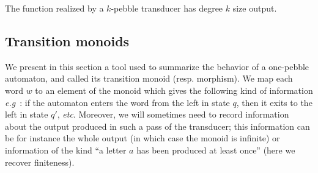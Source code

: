 \begin{comment}

\begin{definition}
  We define, by induction on $k$ the function, realized by a $k$-pebble automaton. The case $k=1$ has been treated in Definition~\ref{def:1pebble}. 
  
  Consider a $k+1$ pebble transducer $\Tt$. We set $Q_i$ to be the set of states of $\Tt_i$.
  Let us define the image of a word $w$ of $\Sigma^*$ by the transduction realized by $\Tt$.
  
  \noindent Let $r=(q_j,\mathsf{pos}_j)_{j\in[1, n]}$ be the accepting run of $\Tt_{k+1}$ over $w$ and $(o_j)_{j\in[1, n]}$ be the outputs of the corresponding configurations.
  
  \noindent For every $q\in Q_i$, let $f^i_q:\Sigma_{[k,i+1]}^*\rightarrow \Gamma^*$ be the transduction realized by $\Tt[1,i]$, considering $q$ as its initial state.
   
   For every $j\in[1,n]$, let $w_j$ be the word obtained from $w$ by replacing the letter $a$ at position $\mathsf{pos}_j$ by $(a,k+1)$.
      For every $j\in[1,n]$, let $u_j$ be the word obtained from $o_j$ by replacing every state $q\in Q_i$ by $f^i_q(w_j)$.
      
  The image of $w$ by $\Tt$ is the word $(u_j)_{j\in[1,n]}$.
  \end{definition}

    
\end{comment}




\begin{proposition}[\cite{}]
  \label{prop:degree}
The function realized by a $k$-pebble transducer has degree $k$ size output.
\end{proposition}

\subsection{Transition monoids}
We present in this section a tool used to summarize the behavior of a one-pebble automaton, and called its transition monoid (resp. morphism). We map each word  $w$ to an element of the monoid which gives the following kind of information \textit{e.g}~: if the automaton enters the word from the left in state $q$, then it exits to the left in state $q'$, \textit{etc}.
Moreover, we will sometimes need to record information about the output produced in such a pass of the transducer; this information can be for instance the whole output (in which case the monoid is infinite) or information of the kind ``a letter $a$ has been produced at least once'' (here we recover finiteness).

